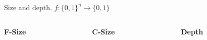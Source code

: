 \begin{frame}{Size and depth. $f\colon \{0, 1\}^n \to \{0, 1\}$}
    \begin{columns}
        \begin{column}[t]{0.32\linewidth}
            \centering
            \textbf{F-Size}

            \vspace{0.2cm}

            \vspace{0.2cm}

            \vspace{0.2cm}
        \end{column}
        \begin{column}[t]{0.32\linewidth}
            \centering 
            \textbf{C-Size}

            \vspace{0.2cm}

            
            \vspace{0.2cm}

            \vspace{0.2cm}
        \end{column}
        \begin{column}[t]{0.32\linewidth}
            \centering
            \textbf{Depth}

            \vspace{0.2cm}

            \vspace{0.2cm}

            \vspace{0.2cm}
        \end{column}
    \end{columns}

    \vspace{0.35cm}
    \begin{center}
    \end{center}

\end{frame}


